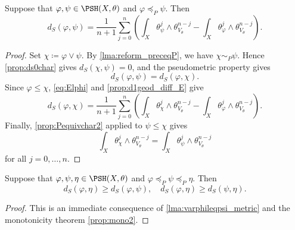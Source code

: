 \begin{lemma}\label{lma:varphileqpsi_metric}
    Suppose that $\varphi,\psi\in \PSH(X,\theta)$ and $\varphi\preceq_P \psi$. Then
    \[
    d_S(\varphi,\psi)=\frac{1}{n+1}\sum_{j=0}^n \left(\int_X \theta_{\psi}^j\wedge \theta_{V_{\theta}}^{n-j}-\int_X \theta_{\varphi}^j\wedge \theta_{V_{\theta}}^{n-j}\right).
    \]
\end{lemma}
\begin{proof}
    Set $\chi\coloneqq\varphi\lor\psi$. By \cref{lma:reform_preceqP}, we have $\chi\sim_P\psi$. Hence \cref{prop:ds0char} gives $d_S(\chi,\psi)=0$, and the pseudometric property gives
    \[
        d_S(\varphi,\psi)=d_S(\varphi,\chi).
    \]
    Since $\varphi\leq\chi$, \eqref{eq:Elphi} and \cref{prop:d1geod_diff_E} give
    \[
    d_S(\varphi,\chi)=\frac{1}{n+1}\sum_{j=0}^n \left(\int_X \theta_{\chi}^j\wedge \theta_{V_{\theta}}^{n-j}-\int_X \theta_{\varphi}^j\wedge \theta_{V_{\theta}}^{n-j}\right).
    \]
    Finally, \cref{prop:Pequivchar2} applied to $\psi\leq\chi$ gives
    \[
        \int_X \theta_{\chi}^j\wedge \theta_{V_{\theta}}^{n-j}=\int_X \theta_{\psi}^j\wedge \theta_{V_{\theta}}^{n-j}
    \]
    for all $j=0,\ldots,n$.
\end{proof}
\begin{corollary}\label{cor:dsthreeterm}
    Suppose that $\varphi,\psi,\eta\in \PSH(X,\theta)$ and $\varphi\preceq_P\psi\preceq_P \eta$. Then
    \[
        d_S(\varphi,\eta)\geq d_S(\varphi,\psi),\quad d_S(\varphi,\eta)\geq d_S(\psi,\eta).
    \]
\end{corollary}
\begin{proof}
    This is an immediate consequence of \cref{lma:varphileqpsi_metric} and the monotonicity theorem \cref{prop:mono2}.
\end{proof}

